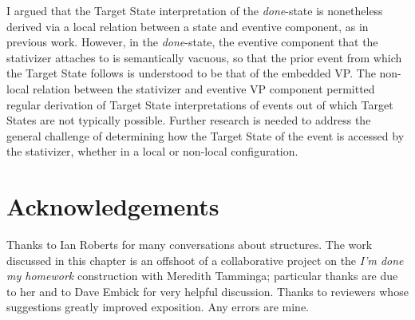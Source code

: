 \documentclass[output=paper,modfonts,nonflat]{langsci/langscibook}
\begin{document}
I argued that the Target State interpretation of the \emph{done}-state is
nonetheless derived via a local relation between a state and eventive
component, as in previous work. However, in the \emph{done}-state, the eventive
component that the stativizer attaches to is semantically vacuous, so that the
prior event from which the Target State follows is understood to be that of the
embedded VP\@. The non-local relation between the stativizer and eventive VP
component permitted regular derivation of Target State interpretations of
events out of which Target States are not typically possible. Further research
is needed to address the general challenge of determining how the Target State
of the event is accessed by the stativizer, whether in a local or non-local
configuration.



\printchapterglossary{}

\section*{Acknowledgements}

Thanks to Ian Roberts for many conversations about  structures. The work
discussed in this chapter is an offshoot of a collaborative project on the
\emph{I'm done my homework} construction with Meredith Tamminga; particular
thanks are due to her and to Dave Embick for very helpful discussion. Thanks to
reviewers whose suggestions greatly improved exposition. Any errors are mine.

{\sloppy
\printbibliography[heading=subbibliography,notkeyword=this]
}
\end{document}
